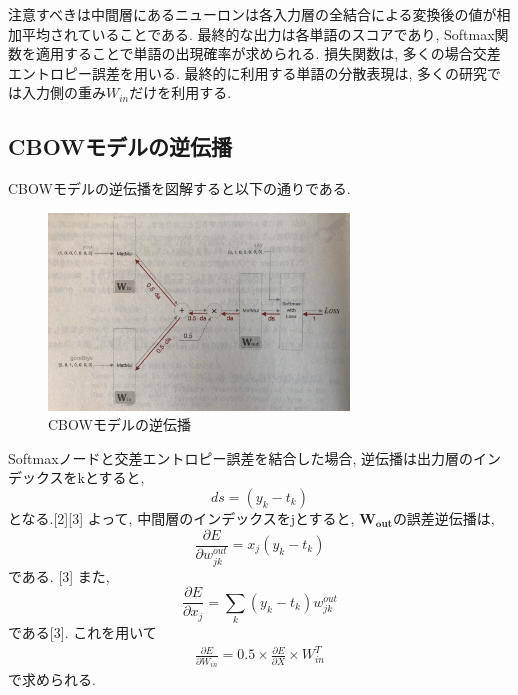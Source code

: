 \documentclass[twocolumn]{jarticle}
\begin{document}
注意すべきは中間層にあるニューロンは各入力層の全結合による変換後の値が相加平均されていることである. 最終的な出力は各単語のスコアであり, Softmax関数を適用することで単語の出現確率が求められる. 損失関数は, 多くの場合交差エントロピー誤差を用いる.
最終的に利用する単語の分散表現は, 多くの研究では入力側の重み${W_{in}}$だけを利用する.

\subsection{CBOWモデルの逆伝播}
CBOWモデルの逆伝播を図解すると以下の通りである.
\begin{figure}[!htbp]
  \begin{center}
    \includegraphics[width=8cm]{./CBOW_bp.jpg}
    \caption{CBOWモデルの逆伝播}
    \label{fig:}
  \end{center}
\end{figure}

Softmaxノードと交差エントロピー誤差を結合した場合, 逆伝播は出力層のインデックスをkとすると,
\begin{equation}
  ds = (y_k - t_k)
\end{equation}
となる.[2][3]
よって, 中間層のインデックスをjとすると, ${\bm {W_{out}}}$の誤差逆伝播は,
\begin{equation}
  \frac{\partial E}{\partial w^{out}_{jk}} = x_j (y_k - t_k)
\end{equation}
である. [3] また,
\begin{equation}
  \frac{\partial E}{\partial x_j} = \sum_{k} (y_k - t_k)w^{out}_{jk}
\end{equation}
である[3]. これを用いて
\begin{eqnarray}
  \frac{\partial E}{\partial W_{in}} = 0.5 \times \frac{\partial E}{\partial X} \times W^T_{in}
\end{eqnarray}
で求められる.
\end{document}
